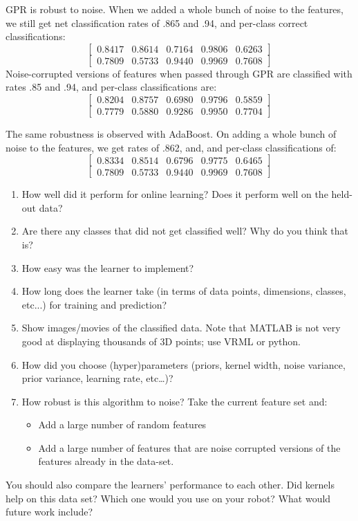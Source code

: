 \documentclass[letterpaper]{article}
\begin{document}
GPR is robust to noise. When we added a whole bunch of noise to the features, we still get net classification rates of .865 and .94, and per-class correct classifications:
$$\begin{bmatrix} 0.8417 &   0.8614 &   0.7164   & 0.9806  &  0.6263\end{bmatrix}$$
$$\begin{bmatrix} 0.7809  &  0.5733  &  0.9440&    0.9969    &0.7608\end{bmatrix}$$
Noise-corrupted versions of features when passed through GPR are classified with rates .85 and .94, and per-class classifications are:
$$\begin{bmatrix} 0.8204  &  0.8757 &   0.6980  &  0.9796 &   0.5859\end{bmatrix}$$
$$\begin{bmatrix} 0.7779  &  0.5880  &  0.9286  &  0.9950 &   0.7704\end{bmatrix}$$

The same robustness is observed with AdaBoost. On adding a whole bunch of noise to the features, we get rates of .862, and, and per-class classifications of:
$$\begin{bmatrix} 0.8334 &   0.8514 &   0.6796  & 0.9775  &  0.6465\end{bmatrix}$$
$$\begin{bmatrix} 0.7809  &  0.5733  &  0.9440&    0.9969    &0.7608\end{bmatrix}$$

\begin{enumerate}
\item How well did it perform for online learning?  Does it perform well on the held-out data?
\item Are there any classes that did not get classified well?  Why do you think that is?
\item How easy was the learner to implement?
\item How long does the learner take (in terms of data points, dimensions, classes, etc...) for training and prediction?
\item Show images/movies of the classified data.  Note that MATLAB is not very good at displaying thousands of 3D points; use VRML or python.
\item How did you choose (hyper)parameters (priors, kernel width, noise variance, prior variance, learning rate, etc\ldots)?
\item How robust is this algorithm to noise? Take the current feature set and:
  \begin{itemize}
  \item Add a large number of random features
  \item Add a large number of features that are noise corrupted versions of the features already in the data-set.
  \end{itemize}

\end{enumerate}

You should also compare the learners' performance to each other.  Did kernels help on this data set?  Which one would you use on your robot?  What would future work include?
\end{document}
